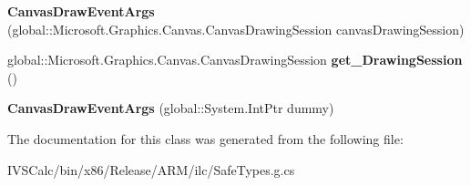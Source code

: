 \begin{DoxyCompactItemize}
\mbox{\label{class_microsoft_1_1_graphics_1_1_canvas_1_1_u_i_1_1_xaml_1_1_canvas_draw_event_args_a7c611838656ec15a66449dc1811b44b3}} 
{\bfseries Canvas\+Draw\+Event\+Args} (global\+::\+Microsoft.\+Graphics.\+Canvas.\+Canvas\+Drawing\+Session canvas\+Drawing\+Session)
\item 
\mbox{\label{class_microsoft_1_1_graphics_1_1_canvas_1_1_u_i_1_1_xaml_1_1_canvas_draw_event_args_ac6b164ff9cb3ed289d7a835f2548e553}} 
global\+::\+Microsoft.\+Graphics.\+Canvas.\+Canvas\+Drawing\+Session {\bfseries get\+\_\+\+Drawing\+Session} ()
\item 
\mbox{\label{class_microsoft_1_1_graphics_1_1_canvas_1_1_u_i_1_1_xaml_1_1_canvas_draw_event_args_a9e2162ca5b12321e5fdc3e89153e2ea4}} 
{\bfseries Canvas\+Draw\+Event\+Args} (global\+::\+System.\+Int\+Ptr dummy)
\end{DoxyCompactItemize}


The documentation for this class was generated from the following file\+:\begin{DoxyCompactItemize}
\item 
I\+V\+S\+Calc/bin/x86/\+Release/\+A\+R\+M/ilc/Safe\+Types.\+g.\+cs\end{DoxyCompactItemize}
